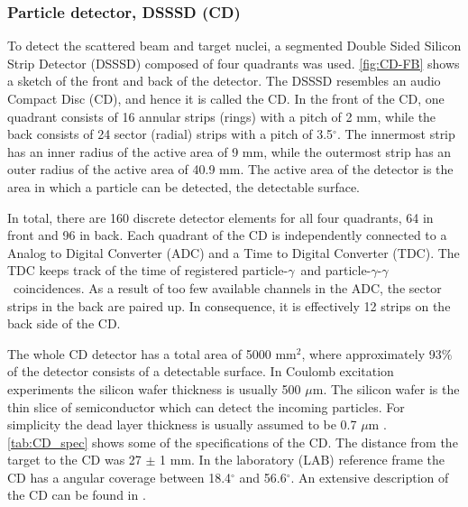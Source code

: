 \documentclass[twoside,english]{uiofysmaster/uiofysmaster}
\newcommand{\ga}{$\gamma$}
\let\orgautoref\autoref
\renewcommand{\autoref}
        {%
		 \def\sectionautorefname{Section}%
		 \def\subsectionautorefname{Section}%
		 \def\subsubsectionautorefname{Section}%
		 \def\chapterautorefname{Chapter}%
          \orgautoref}
\begin{document}
\subsubsection{Particle detector, DSSSD (CD)}
To detect the scattered beam and target nuclei, a segmented Double Sided Silicon Strip Detector (DSSSD) composed of four quadrants was used. 
\autoref{fig:CD-FB} shows a sketch of the front and back of the detector. 
The DSSSD resembles an audio Compact Disc (CD), and hence it is called the CD. 
In the front of the CD, one quadrant consists of 16 annular strips (rings) with a pitch of 2 mm, while the back consists of 24 sector (radial) strips with a pitch of 3.5$^\circ$. 
The innermost strip has an inner radius of the active area of 9 mm, while the outermost strip has an outer radius of the active area of 40.9 mm. 
The active area of the detector is the area in which a particle can be detected, the detectable surface. 

In total, there are 160 discrete detector elements for all four quadrants, 64 in front and 96 in back. 
Each quadrant of the CD is independently connected to a Analog to Digital Converter (ADC) and a Time to Digital Converter (TDC). 
The TDC keeps track of the time of registered particle-\ga\ and particle-\ga-\ga\ coincidences. 
As a result of too few available channels in the ADC, the sector strips in the back are paired up.
In consequence, it is effectively 12 strips on the back side of the CD. 

The whole CD detector has a total area of 5000 mm$^2$, where approximately 93$\%$ of the detector consists of a detectable surface. 
In Coulomb excitation experiments the silicon wafer thickness is usually 500 $\mu$m.
The silicon wafer is the thin slice of semiconductor which can detect the incoming particles. 
For simplicity the dead layer thickness is usually assumed to be 0.7 $\mu$m \cite{NWarr-CD, MB-spect}. 
\autoref{tab:CD_spec} shows some of the specifications of the CD.  
The distance from the target to the CD was 27 $\pm$ 1 mm. 
In the laboratory (LAB) reference frame the CD has a angular coverage between 18.4$^\circ$ and 56.6$^\circ$. An extensive description of the CD can be found in \cite{CD-DSSSD}.

\end{document}

